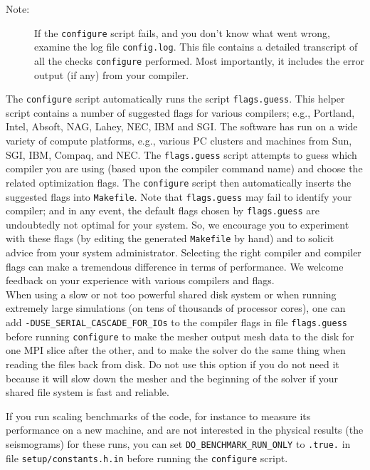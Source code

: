 \documentclass[oneside,english]{book}
\begin{document}
\begin{description}
\item [{Note:}] If the \texttt{configure} script fails, and you don't know
what went wrong, examine the log file \texttt{config.log}. This file
contains a detailed transcript of all the checks \texttt{configure}
performed. Most importantly, it includes the error output (if any)
from your compiler.
\end{description}
The \texttt{configure} script automatically runs the script \texttt{flags.guess}.
This helper script contains a number of suggested flags for various
compilers; e.g., Portland, Intel, Absoft, NAG, Lahey, NEC, IBM and
SGI. The software has run on a wide variety of compute platforms,
e.g., various PC clusters and machines from Sun, SGI, IBM, Compaq,
and NEC. The \texttt{flags.guess} script attempts to guess which compiler
you are using (based upon the compiler command name) and choose the
related optimization flags. The \texttt{configure} script then automatically
inserts the suggested flags into \texttt{Makefile}. Note that \texttt{flags.guess}
may fail to identify your compiler; and in any event, the default
flags chosen by \texttt{flags.guess} are undoubtedly not optimal for
your system. So, we encourage you to experiment with these flags (by
editing the generated \texttt{Makefile} by hand) and to solicit advice
from your system administrator. Selecting the right compiler and compiler
flags can make a tremendous difference in terms of performance. We
welcome feedback on your experience with various compilers and flags.\\

When using a slow or not too powerful shared disk system or when running extremely large simulations
(on tens of thousands of processor cores), one can add \texttt{-DUSE\_SERIAL\_CASCADE\_FOR\_IOs} to the compiler flags
in file \texttt{flags.guess} before running \texttt{configure} to make the mesher output mesh data
to the disk for one MPI slice after the other, and to make the solver do the same thing when reading the files back from disk.
Do not use this option if you do not need it because it will slow down the mesher and the beginning of the solver if your
shared file system is fast and reliable.

If you run scaling benchmarks of the code, for instance to measure its performance on a new machine, and are not interested in the physical results
(the seismograms) for these runs, you can set \texttt{DO\_BENCHMARK\_RUN\_ONLY} to \texttt{.true.} in file \texttt{setup/constants.h.in} before running the \texttt{configure} script.
\end{document}
